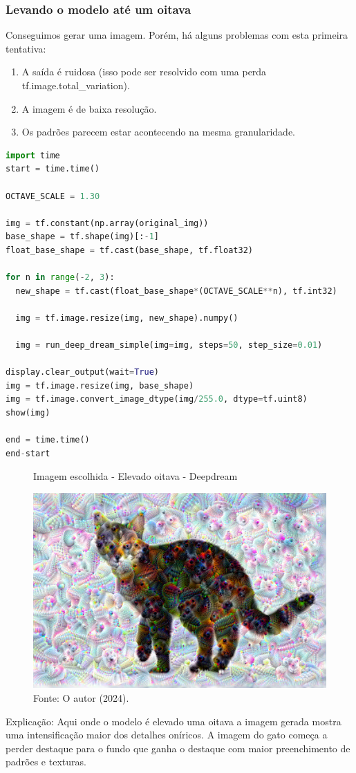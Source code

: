 \subsubsection*{Levando o modelo até um oitava}
Conseguimos gerar uma imagem. Porém, há alguns problemas com esta primeira tentativa:

\begin{enumerate}
    \item A saída é ruidosa (isso pode ser resolvido com uma perda tf.image.total\_variation).
    \item A imagem é de baixa resolução.
    \item Os padrões parecem estar acontecendo na mesma granularidade.
\end{enumerate}
\begin{lstlisting}[language=Python, style=input]
import time
start = time.time()

OCTAVE_SCALE = 1.30

img = tf.constant(np.array(original_img))
base_shape = tf.shape(img)[:-1]
float_base_shape = tf.cast(base_shape, tf.float32)

for n in range(-2, 3):
  new_shape = tf.cast(float_base_shape*(OCTAVE_SCALE**n), tf.int32)

  img = tf.image.resize(img, new_shape).numpy()

  img = run_deep_dream_simple(img=img, steps=50, step_size=0.01)

display.clear_output(wait=True)
img = tf.image.resize(img, base_shape)
img = tf.image.convert_image_dtype(img/255.0, dtype=tf.uint8)
show(img)

end = time.time()
end-start
\end{lstlisting}
\begin{figure}[H]
\centering
\caption{Imagem escolhida - Elevado oitava - Deepdream}
\includegraphics[width=.8\linewidth]{apendices/fig/13_IAA012_13.png}
\caption*{Fonte: O autor (2024).}
\end{figure}
Explicação: Aqui onde o modelo é elevado uma oitava a imagem gerada mostra uma intensificação maior dos detalhes oníricos. A imagem do gato começa a perder destaque para o fundo que ganha o destaque com maior preenchimento de padrões e texturas.

